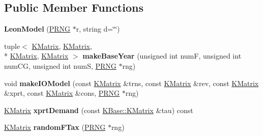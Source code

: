 \subsection*{Public Member Functions}
\begin{DoxyCompactItemize}
\item 
\hypertarget{class_demo_leon_1_1_leon_model_ade569b791f144dd09874a6a435d3d454}{{\bfseries Leon\-Model} (\hyperlink{class_k_base_1_1_p_r_n_g}{P\-R\-N\-G} $\ast$r, string d=\char`\"{}\char`\"{})}\label{class_demo_leon_1_1_leon_model_ade569b791f144dd09874a6a435d3d454}

\item 
\hypertarget{class_demo_leon_1_1_leon_model_abe596fe5b6484256d9b6e048ece102b4}{tuple$<$ \hyperlink{class_k_base_1_1_k_matrix}{K\-Matrix}, \hyperlink{class_k_base_1_1_k_matrix}{K\-Matrix}, \\*
\hyperlink{class_k_base_1_1_k_matrix}{K\-Matrix}, \hyperlink{class_k_base_1_1_k_matrix}{K\-Matrix} $>$ {\bfseries make\-Base\-Year} (unsigned int num\-F, unsigned int num\-C\-G, unsigned int num\-S, \hyperlink{class_k_base_1_1_p_r_n_g}{P\-R\-N\-G} $\ast$rng)}\label{class_demo_leon_1_1_leon_model_abe596fe5b6484256d9b6e048ece102b4}

\item 
\hypertarget{class_demo_leon_1_1_leon_model_a4ab04b66ddf45be9856c276b25ab7b14}{void {\bfseries make\-I\-O\-Model} (const \hyperlink{class_k_base_1_1_k_matrix}{K\-Matrix} \&trns, const \hyperlink{class_k_base_1_1_k_matrix}{K\-Matrix} \&rev, const \hyperlink{class_k_base_1_1_k_matrix}{K\-Matrix} \&xprt, const \hyperlink{class_k_base_1_1_k_matrix}{K\-Matrix} \&cons, \hyperlink{class_k_base_1_1_p_r_n_g}{P\-R\-N\-G} $\ast$rng)}\label{class_demo_leon_1_1_leon_model_a4ab04b66ddf45be9856c276b25ab7b14}

\item 
\hypertarget{class_demo_leon_1_1_leon_model_a24be535e2a835331d9e415fceb6b1468}{\hyperlink{class_k_base_1_1_k_matrix}{K\-Matrix} {\bfseries xprt\-Demand} (const \hyperlink{class_k_base_1_1_k_matrix}{K\-Base\-::\-K\-Matrix} \&tau) const }\label{class_demo_leon_1_1_leon_model_a24be535e2a835331d9e415fceb6b1468}

\item 
\hypertarget{class_demo_leon_1_1_leon_model_a86c01fe873755f13556a983c4fe72725}{\hyperlink{class_k_base_1_1_k_matrix}{K\-Matrix} {\bfseries random\-F\-Tax} (\hyperlink{class_k_base_1_1_p_r_n_g}{P\-R\-N\-G} $\ast$rng)}\label{class_demo_leon_1_1_leon_model_a86c01fe873755f13556a983c4fe72725}


\end{DoxyCompactItemize}
